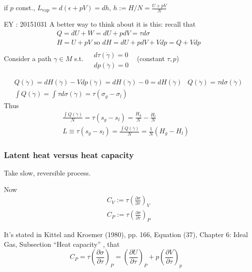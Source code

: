 \documentclass[10pt]{amsart}
\begin{document}
\begin{multicols*}{2}
if $p$ const., $L_{\text{vap}} = d(\epsilon + pV) = dh$, $h:= H/N = \frac{ U + pV}{N}$

EY : 20151031 A better way to think about it is this: recall that
\[
\begin{aligned}
  & Q = dU + W = dU + pdV = \tau d\sigma \\ 
  & H = U + pV \text{ so } dH = dU + pdV + Vdp = Q + Vdp
\end{aligned}
\]
Consider a path $\gamma \in M$ s.t. $\begin{aligned} & \quad \\
  & d\tau(\dot{\gamma}) = 0 \\
  & dp(\dot{\gamma}) = 0 \end{aligned}$ \quad \, (constant $\tau,p$)

\[
\begin{aligned}
  & Q(\dot{\gamma}) = dH(\dot{\gamma}) - Vdp(\dot{\gamma}) = dH(\dot{\gamma}) - 0 = dH(\dot{\gamma})
  & Q(\dot{\gamma}) = \tau d\sigma(\dot{\gamma}) \\ 
  & \int Q(\dot{\gamma}) = \int \tau d\sigma(\dot{\gamma}) = \tau(\sigma_g - \sigma_l)
\end{aligned}
\]
Thus
\[
\begin{gathered}
  \frac{ \int Q(\dot{\gamma})}{ N} = \tau (s_g - s_l ) = \frac{H_g}{N} - \frac{H_l}{N} \\ 
  L \equiv \tau(s_g - s_l) = \frac{ \int Q(\dot{\gamma})}{ N} = \frac{1}{N} (H_g -H_l)
\end{gathered}
\]

\subsubsection*{Latent heat versus heat capacity}

Take slow, reversible process.  

Now 
\[
\begin{aligned}
  & C_V := \tau \left( \frac{ \partial \sigma }{ \partial \tau} \right)_V \\ 
  & C_P := \tau \left( \frac{ \partial \sigma }{ \partial \tau } \right)_P
\end{aligned}
\]

It's stated in Kittel and Kroemer (1980), pp. 166, Equation (37), Chapter 6: Ideal Gas, Subsection ``Heat capacity'' \cite{CKittelHKroemer1980}, that 
\begin{equation}
  C_P = \tau \left( \frac{ \partial \sigma }{ \partial \tau} \right)_P = \left( \frac{ \partial U }{ \partial \tau} \right)_P + p \left( \frac{ \partial V}{ \partial \tau} \right)_p
\end{equation}


\end{multicols*}
\end{document}

